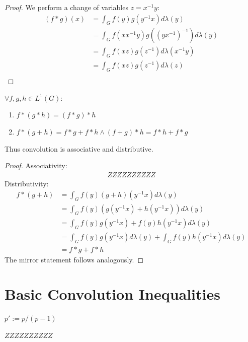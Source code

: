 \begin{proof}
We perform a change of variables $z = x^{-1}y$:
\begin{align*}
(f \ast g)(x) &= \int_G f(y)g(y^{-1}x) d\lambda(y) \\
&= \int_G f(xx^{-1}y)g((yx^{-1})^{-1}) d\lambda(y) \\
\tag{Left Invariance}
&= \int_G f(xz)g(z^{-1}) d\lambda(x^{-1}y) \\
&= \int_G f(xz)g(z^{-1}) d\lambda(z) \\
\end{align*}
\end{proof}

\begin{proposition}

$\forall f,g,h \in L^1(G):$
\begin{enumerate}
\item
$f \ast (g \ast h) = (f \ast g) \ast h $
\item
$f \ast (g + h) = f \ast g + f \ast h \wedge (f+g) \ast h = f\ast h + f\ast g $
\end{enumerate}
Thus convolution is associative and distributive.
\end{proposition}

\begin{proof}
Associativity:
\begin{align*}
ZZZZZZZZZZ
\end{align*}
Distributivity:
\begin{align*}
f \ast (g + h) &= \int_G f(y) (g+h)(y^{-1}x)d\lambda(y)\\
&= \int_G f(y) (g(y^{-1}x)+h(y^{-1}x))d\lambda(y)\\
&= \int_G f(y)g(y^{-1}x)+f(y)h(y^{-1}x)d\lambda(y)\\
&= \int_G f(y)g(y^{-1}x) d\lambda(y) + \int_G f(y)h(y^{-1}x) d\lambda(y)\\
&= f \ast g + f \ast h
\end{align*}
The mirror statement follows analogously. 
\end{proof}

\section{Basic Convolution Inequalities}

\begin{definition}
$ p' := p / (p-1) $
\end{definition}

\begin{remark}
$ZZZZZZZZZZ$
\end{remark}

